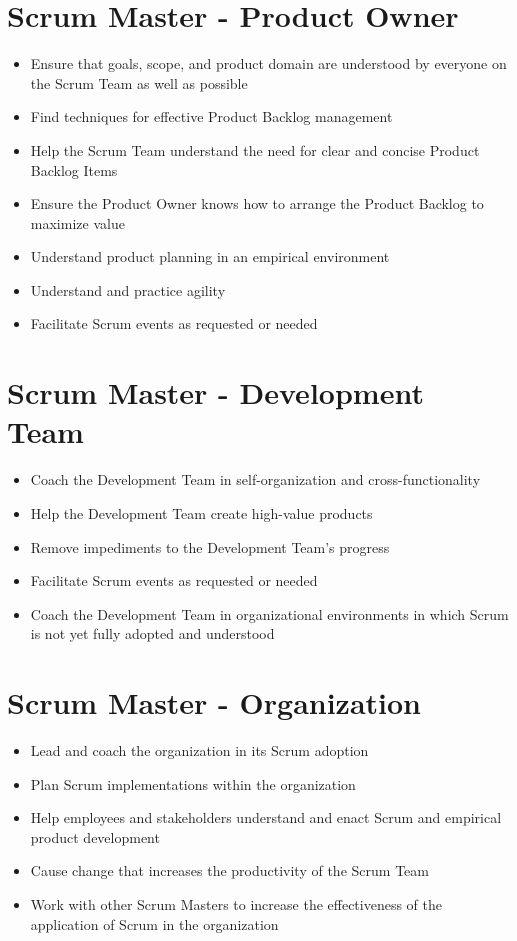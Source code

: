 \documentclass[a4paper,11pt,twocolumn]{article}
\begin{document}
\section*{Scrum Master - Product Owner}
\begin{itemize}
    \item Ensure that goals, scope, and product domain are understood by everyone on the Scrum Team as well as possible
    \item Find techniques for effective Product Backlog management
    \item Help the Scrum Team understand the need for clear and concise Product Backlog Items
    \item Ensure the Product Owner knows how to arrange the Product Backlog to maximize value
    \item Understand product planning in an empirical environment
    \item Understand and practice agility
    \item Facilitate Scrum events as requested or needed
\end{itemize}

\section*{Scrum Master - Development Team}
\begin{itemize}
    \item Coach the Development Team in self-organization and cross-functionality
    \item Help the Development Team create high-value products
    \item Remove impediments to the Development Team's progress
    \item Facilitate Scrum events as requested or needed
    \item Coach the Development Team in organizational environments in which Scrum is not yet fully adopted and understood
\end{itemize}

\section*{Scrum Master - Organization}
\begin{itemize}
    \item Lead and coach the organization in its Scrum adoption
    \item Plan Scrum implementations within the organization
    \item Help employees and stakeholders understand and enact Scrum and empirical product development
    \item Cause change that increases the productivity of the Scrum Team
    \item Work with other Scrum Masters to increase the effectiveness of the application of Scrum in the organization
\end{itemize}
\end{document}
